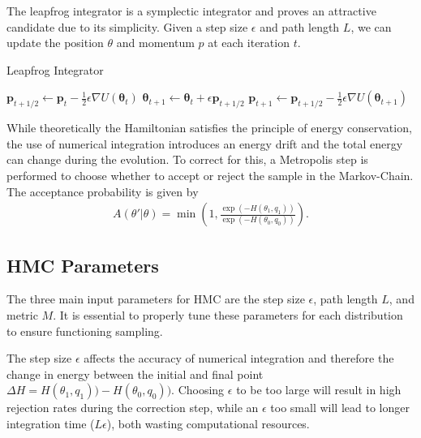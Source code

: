 \documentclass[11pt]{article}
\begin{document}
    The leapfrog integrator is a symplectic integrator and proves an attractive candidate due to its simplicity.
    Given a step size $\epsilon$ and path length $L$, we can update the position $\theta$ and momentum $p$ at each iteration $t$.
    \begin{algorithm}
    \caption{Leapfrog Integrator}
    \label{alg:leapfrog_integrator}
    \begin{algorithmic}
        \STATE {}
        \STATE $\mathbf{p}_{t+1/2} \gets \mathbf{p}_t - \frac{1}{2} \epsilon \nabla U(\mathbf{\theta}_t)$
        \STATE
        \STATE $ \mathbf{\theta}_{t+1} \gets \mathbf{\theta}_t + \epsilon \mathbf{p}_{t+1/2}$
        \STATE
        \STATE $ \mathbf{p}_{t+1} \gets \mathbf{p}_{t+1/2} - \frac{1}{2} \epsilon \nabla U(\mathbf{\theta}_{t+1})$
        \ENDFOR
    \end{algorithmic}
    \end{algorithm}

    While theoretically the Hamiltonian satisfies the principle of energy conservation, the use of numerical
    integration introduces an energy drift and the total energy can change during the evolution.
    To correct for this, a Metropolis step is performed to choose whether to accept or reject the sample in
    the Markov-Chain.
    The acceptance probability is given by
    \begin{equation}\label{eq:hmc_accept_prob}
    \begin{aligned}
        A(\theta' | \theta) = \min \left(1, \frac{\exp(-H(\theta_1, q_1)) }{\exp(-H(\theta_0, q_0)) } \right).
    \end{aligned}
    \end{equation}

\subsection{HMC Parameters}\label{subsec:hmc_params}
    The three main input parameters for HMC are the step size $\epsilon$, path length $L$, and metric $M$.
    It is essential to properly tune these parameters for each distribution to ensure functioning sampling.

    The step size $\epsilon$ affects the accuracy of numerical integration and therefore the change in energy between the initial
    and final point $\Delta H = H(\theta_1, q_1)) - H(\theta_0, q_0))$.
    Choosing $\epsilon$ to be too large will result in high rejection rates during the correction step,
    while an $\epsilon$ too small will lead to longer integration
    time ($L\epsilon$), both wasting computational resources.
\end{document}
